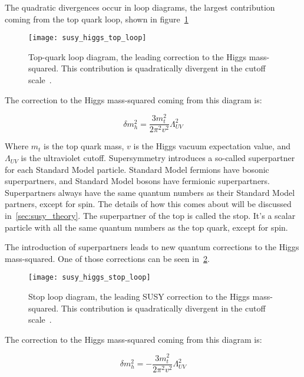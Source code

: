 The quadratic divergences occur in loop diagrams,
the largest contribution coming from the top quark loop, shown in figure~\ref{fig:susy_top_loop}

\begin{figure}[!ht]
    \centering
\texttt{[image: susy\_higgs\_top\_loop]}
\caption{Top-quark loop diagram, the leading correction to the Higgs mass-squared. This contribution is quadratically divergent in the cutoff scale~\cite{susy-primer-1998}.}
\label{fig:susy_top_loop}
\end{figure}

The correction to the Higgs mass-squared coming from this diagram is:

\begin{equation}\label{eq:higgs_top_correction}
    \delta m_h^2 = \frac{3m_t^2}{2\pi^2 v^2}\Lambda_{UV}^2
\end{equation}\cite{susy-primer-1998}

Where $m_t$ is the top quark mass, $v$ is the Higgs vacuum expectation value, and $\Lambda_{UV}$ is the ultraviolet cutoff.
Supersymmetry introduces a so-called superpartner for each Standard Model particle.
Standard Model fermions have bosonic superpartners, and Standard Model bosons have fermionic superpartners.
Superpartners always have the same quantum numbers as their Standard Model partners, except for spin.
The details of how this comes about will be discussed in~\ref{sec:susy_theory}.
The superpartner of the top is called the stop.
It's a scalar particle with all the same quantum numbers as the top quark, except for spin.

The introduction of superpartners leads to new quantum corrections to the Higgs mass-squared.
One of those corrections can be seen in~\ref{fig:susy_stop_loop}.

\begin{figure}[!ht]
    \centering
\texttt{[image: susy\_higgs\_stop\_loop]}
\caption{Stop loop diagram, the leading SUSY correction to the Higgs mass-squared. This contribution is quadratically divergent in the cutoff scale~\cite{susy-primer-1998}.}
\label{fig:susy_stop_loop}
\end{figure}

The correction to the Higgs mass-squared coming from this diagram is:

\begin{equation}\label{eq:higgs_stop_correction}
    \delta m_h^2 = -\frac{3m_t^2}{2\pi^2 v^2}\Lambda_{UV}^2
\end{equation}~\cite{susy-primer-1998}

